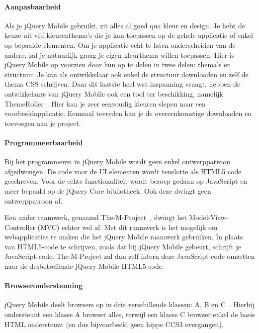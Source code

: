 \paragraph{Aanpasbaarheid}
Als je jQuery Mobile  gebruikt, zit alles al goed qua kleur en design. Je hebt de keuze uit vijf kleurenthema's die je kan toepassen op de gehele applicatie of enkel op bepaalde elementen. Om je applicatie echt te laten onderscheiden van de andere, zal je natuurlijk graag je eigen kleurthema willen toepassen. Hier is jQuery Mobile op voorzien door hun  op te delen in twee delen: thema's en structuur. Je kan als ontwikkelaar ook enkel de structuur downloaden en zelf de thema CSS schrijven. Daar dit laatste heel wat inspanning vraagt, hebben de ontwikkelaars van jQuery Mobile ook een tool ter beschikking,  namelijk ThemeRoller~\cite{JQuery2012c}. Hier kan je zeer eenvoudig kleuren slepen naar een voorbeeldapplicatie. Eenmaal tevreden kan je de overeenkomstige  downloaden en toevoegen aan je project.

\paragraph{Programmeerbaarheid}
Bij het programmeren in jQuery Mobile wordt geen enkel ontwerppatroon afgedwongen. De code voor de UI elementen wordt tenslotte als HTML5 code geschreven. Voor de echte functionaliteit wordt beroep gedaan op JavaScript en meer bepaald op de jQuery Core bibliotheek. Ook deze dwingt geen ontwerppatroon af.

Een ander raamwerk, genaamd The-M-Project~\cite{Panacoda2012}, dwingt het Model-View-Controller (MVC) echter wel af. Met dit raamwerk is het mogelijk om webapplicaties te maken die het jQuery Mobile raamwerk gebruiken. In plaats van HTML5-code te schrijven, zoals dat bij jQuery Mobile gebeurt, schrijft je JavaScript-code. The-M-Project zal dan zelf intern deze JavaScript-code omzetten naar de desbetreffende jQuery Mobile HTML5-code.

\paragraph{Browserondersteuning}
\label{sec:jqm-browser-support}
jQuery Mobile deelt browsers op in drie verschillende klassen: A, B en C~\cite{JQuery2012d}. Hierbij ondersteunt een klasse A browser alles, terwijl een klasse C browser enkel de basis HTML ondersteunt (en dus bijvoorbeeld geen hippe CCS3 overgangen).

